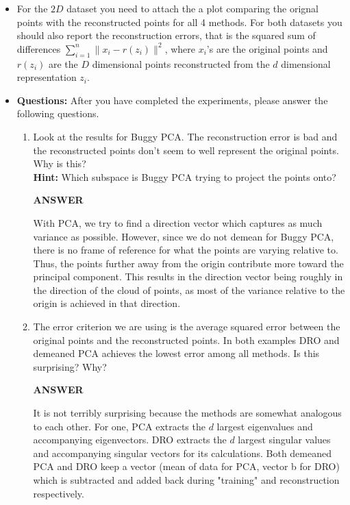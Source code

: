 \documentclass[a4paper]{article}
\theoremstyle{definition}
\begin{document}
\begin{itemize}
\item
For the $2D$ dataset you need to attach the a 
plot comparing the orignal points with the reconstructed points for all 4
methods.
For both datasets you should also report the reconstruction errors, that is the squared sum of
differences $\sum_{i=1}^n \|x_i - r(z_i)\|^2$,
where $x_i$'s are the original points and $r(z_i)$ are the $D$ dimensional points
reconstructed from the 
$d$ dimensional representation $z_i$.

\item \textbf{Questions:} After you have completed the experiments, please answer the following questions.
\begin{enumerate}
\item Look at the results for Buggy PCA. The reconstruction error is bad and the
reconstructed points don't seem to well represent the original points. Why is
this? \\
\textbf{Hint: } Which subspace is Buggy PCA trying to project the points
onto?

\textbf{ANSWER}

With PCA, we try to find a direction vector which captures as much variance as possible. However, since we do not demean for Buggy PCA, there is no frame of reference for what the points are varying relative to. Thus, the points further away from the origin contribute more toward the principal component. This results in the direction vector being roughly in the direction of the cloud of points, as most of the variance relative to the origin is achieved in that direction.

\item The error criterion we are using is the average squared error 
between the original points and the reconstructed points.
In both examples DRO and demeaned PCA achieves the lowest error among all
methods. 
Is this surprising? Why?

\textbf{ANSWER}

It is not terribly surprising because the methods are somewhat analogous to each other. 
For one, PCA extracts the $d$ largest eigenvalues and accompanying eigenvectors.
DRO extracts the $d$ largest singular values and accompanying singular vectors for its calculations.
Both demeaned PCA and DRO keep a vector (mean of data for PCA, vector b for DRO) which is subtracted and added back during "training" and reconstruction respectively.

\end{enumerate}


\end{itemize}
\end{document}
